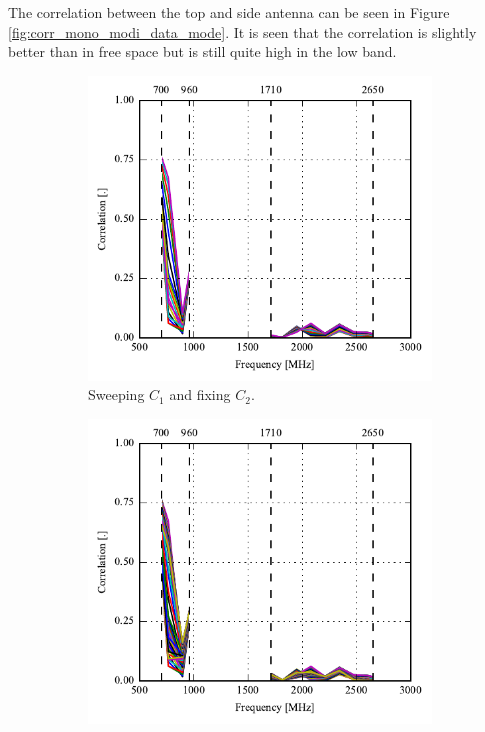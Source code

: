 The correlation between the top and side antenna can be seen in Figure \ref{fig:corr_mono_modi_data_mode}. It is seen that the correlation is slightly better than in free space but is still quite high in the low band.

\begin{figure}[htbp]
    \centering
    \begin{subfigure}{0.49\linewidth}
        \includegraphics{img/tech_sol/monopole/highband/ue/datamode/corr_top.pdf}
        \caption{Sweeping $C_1$ and fixing $C_2$.}
    \end{subfigure}
    \hfill
    \begin{subfigure}{0.49\linewidth}
        \includegraphics{img/tech_sol/monopole/highband/ue/datamode/corr_side.pdf}

\end{subfigure}
\end{figure}
